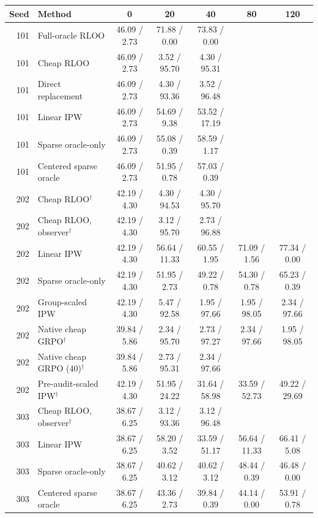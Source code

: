 \begin{tabular}{rlccccc}
\toprule
Seed & Method & 0 & 20 & 40 & 80 & 120 \\
\midrule
101 & Full-oracle RLOO & 46.09 / 2.73 & 71.88 / 0.00 & 73.83 / 0.00 &  &  \\
101 & Cheap RLOO & 46.09 / 2.73 & 3.52 / 95.70 & 4.30 / 95.31 &  &  \\
101 & Direct replacement & 46.09 / 2.73 & 4.30 / 93.36 & 3.52 / 96.48 &  &  \\
101 & Linear IPW & 46.09 / 2.73 & 54.69 / 9.38 & 53.52 / 17.19 &  &  \\
101 & Sparse oracle-only & 46.09 / 2.73 & 55.08 / 0.39 & 58.59 / 1.17 &  &  \\
101 & Centered sparse oracle & 46.09 / 2.73 & 51.95 / 0.78 & 57.03 / 0.39 &  &  \\
202 & Cheap RLOO$^\dagger$ & 42.19 / 4.30 & 4.30 / 94.53 & 4.30 / 95.70 &  &  \\
202 & Cheap RLOO, observer$^\dagger$ & 42.19 / 4.30 & 3.12 / 95.70 & 2.73 / 96.88 &  &  \\
202 & Linear IPW & 42.19 / 4.30 & 56.64 / 11.33 & 60.55 / 1.95 & 71.09 / 1.56 & 77.34 / 0.00 \\
202 & Sparse oracle-only & 42.19 / 4.30 & 51.95 / 2.73 & 49.22 / 0.78 & 54.30 / 0.78 & 65.23 / 0.39 \\
202 & Group-scaled IPW & 42.19 / 4.30 & 5.47 / 92.58 & 1.95 / 97.66 & 1.95 / 98.05 & 2.34 / 97.66 \\
202 & Native cheap GRPO$^\dagger$ & 39.84 / 5.86 & 2.34 / 95.70 & 2.73 / 97.27 & 2.34 / 97.66 & 1.95 / 98.05 \\
202 & Native cheap GRPO (40)$^\dagger$ & 39.84 / 5.86 & 2.73 / 95.31 & 2.34 / 97.66 &  &  \\
202 & Pre-audit-scaled IPW$^\dagger$ & 42.19 / 4.30 & 51.95 / 24.22 & 31.64 / 58.98 & 33.59 / 52.73 & 49.22 / 29.69 \\
303 & Cheap RLOO, observer$^\dagger$ & 38.67 / 6.25 & 3.12 / 93.36 & 3.12 / 96.48 &  &  \\
303 & Linear IPW & 38.67 / 6.25 & 58.20 / 3.52 & 33.59 / 51.17 & 56.64 / 11.33 & 66.41 / 5.08 \\
303 & Sparse oracle-only & 38.67 / 6.25 & 40.62 / 3.12 & 40.62 / 3.12 & 48.44 / 0.39 & 46.48 / 0.00 \\
303 & Centered sparse oracle & 38.67 / 6.25 & 43.36 / 2.73 & 39.84 / 0.39 & 44.14 / 0.00 & 53.91 / 0.78 \\

\end{tabular}
